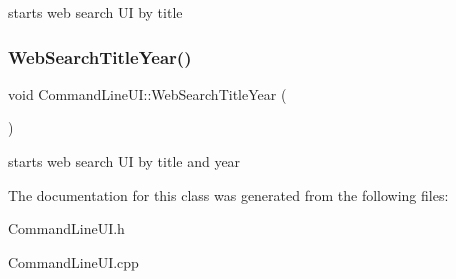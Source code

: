 starts web search UI by title \mbox{\label{class_command_line_u_i_a9aadc77fe37d190f9a3931c7babac900}} 
\subsubsection{\texorpdfstring{Web\+Search\+Title\+Year()}{WebSearchTitleYear()}}
{\footnotesize\ttfamily void Command\+Line\+U\+I\+::\+Web\+Search\+Title\+Year (\begin{DoxyParamCaption}{ }\end{DoxyParamCaption})\hspace{0.3cm}{\ttfamily [static]}}

starts web search UI by title and year 

The documentation for this class was generated from the following files\+:\begin{DoxyCompactItemize}
\item 
Command\+Line\+U\+I.\+h\item 
Command\+Line\+U\+I.\+cpp\end{DoxyCompactItemize}
